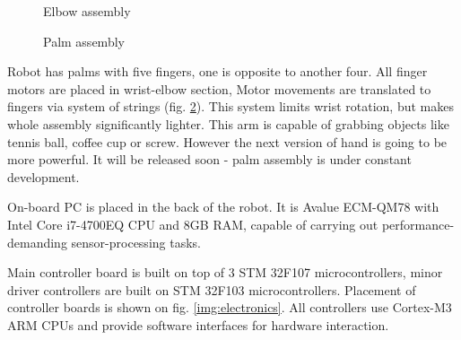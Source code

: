 \documentclass[letterpaper, 10 pt, conference]{ieeeconf}  %
\begin{document}
\begin{figure}[thpb]
\centering
{}
\caption{Elbow assembly}
\label{img:joints}
\end{figure}

\begin{figure}[thpb]
\centering
{}
\caption{Palm assembly}
\label{img:wrist}
\end{figure} 

Robot has palms with five fingers, one is opposite to another four. All
finger motors are placed in wrist-elbow section, Motor movements are
translated to fingers via system of strings (fig. \ref{img:wrist}). This system
limits wrist rotation, but makes whole assembly significantly lighter. This arm
is capable of grabbing objects like tennis ball, coffee cup or screw. However the next
version of hand is going to be more powerful. It will be released soon - palm
assembly is under constant development.

On-board PC is placed in the back of the robot. It is Avalue ECM-QM78 with Intel
Core i7-4700EQ CPU and 8GB RAM, capable of carrying out performance-demanding
sensor-processing tasks. 

Main controller board is built on top of 3 STM 32F107 microcontrollers, minor
driver controllers are built on STM 32F103 microcontrollers. Placement of
controller boards is shown on fig. \ref{img:electronics}.  All controllers use
Cortex-M3 ARM CPUs and provide software interfaces for hardware interaction.
\end{document}

